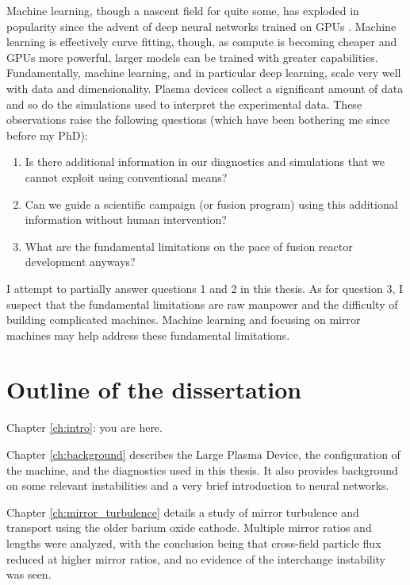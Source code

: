 Machine learning, though a nascent field for quite some, has exploded in popularity since the advent of deep neural networks trained on GPUs \cite{krizhevsky_imagenet_2017}. Machine learning is effectively curve fitting, though, as compute is becoming cheaper and GPUs more powerful, larger models can be trained with greater capabilities. Fundamentally, machine learning, and in particular deep learning, scale very well with data and dimensionality. Plasma devices collect a significant amount of data and so do the simulations used to interpret the experimental data. These observations raise the following questions (which have been bothering me since before my PhD): 
\begin{enumerate}
	\item Is there additional information in our diagnostics and simulations that we cannot exploit using conventional means?
	\item Can we guide a scientific campaign (or fusion program) using this additional information without human intervention?
	\item What are the fundamental limitations on the pace of fusion reactor development anyways?
\end{enumerate}

I attempt to partially answer questions 1 and 2 in this thesis. As for question 3, I suspect that the fundamental limitations are raw manpower and the difficulty of building complicated machines. Machine learning and focusing on mirror machines may help address these fundamental limitations.


\section{Outline of the dissertation}
Chapter \ref{ch:intro}: you are here. 

Chapter \ref{ch:background} describes the Large Plasma Device, the configuration of the machine, and the diagnostics used in this thesis. It also provides background on some relevant instabilities and a very brief introduction to neural networks. 

Chapter \ref{ch:mirror_turbulence} details a study of mirror turbulence and transport using the older barium oxide cathode. Multiple mirror ratios and lengths were analyzed, with the conclusion being that cross-field particle flux reduced at higher mirror ratios, and no evidence of the interchange instability was seen.

